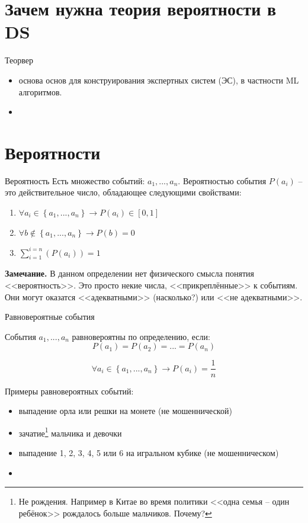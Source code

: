   
\section{Зачем нужна теория вероятности в DS}\label{section:why_probability}
\begin{frame}
Теорвер

\begin{itemize}
\item основа основ для конструирования экспертных систем (ЭС), 
в частности ML алгоритмов.
\item 
\end{itemize}
\end{frame}

\section{Вероятности}

\begin{frame}{Вероятность}
	Есть множество событий: $a_1, ..., a_n$.
	Вероятностью события $P(a_i)$ -- это действительное число, обладающее следующими свойствами:
\begin{enumerate}
	\item $\forall a_i \in \left\{a_1, ..., a_n \right\} \rightarrow P(a_i) \in [0, 1]$
	\item $\forall b \notin \left\{a_1, ..., a_n \right\} \rightarrow P(b) = 0$
	\item $\sum_{i=1}^{i=n}\left(P(a_i)\right) = 1$
\end{enumerate}


\textbf{Замечание.}
В данном определении нет физического смысла понятия 
<<вероятность>>. Это просто некие числа, 
<<прикреплённые>> к событиям.
Они могут оказатся <<адекватными>> (насколько?)
или <<не адекватными>>.

\end{frame}

\begin{frame}{Равновероятные события}
\small

События  $a_1, ..., a_n$ равновероятны по определению, если:
\begin{equation}
   P(a_1) = P(a_2) = ... = P(a_n)
\end{equation}

\begin{equation}
 \forall a_i \in \left\{a_1, ..., a_n \right\} \rightarrow P(a_i) = \frac{1}{n}
\end{equation}

Примеры равновероятных событий:
\begin{itemize}
	\item выпадение орла или решки на монете (не мошеннической)
	\item зачатие\footnote{Не рождения. Например в Китае во время политики <<одна семья -- один ребёнок>> рождалось больше мальчиков. Почему?} мальчика и девочки
	\item выпадение 1, 2, 3, 4, 5 или 6 на игральном кубике (не мошенническом)
	\item {}
\end{itemize}

\end{frame}


